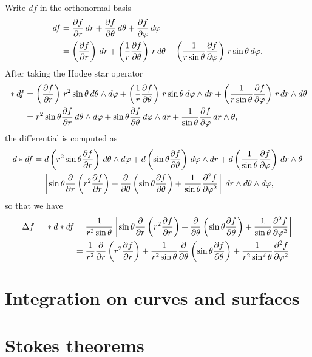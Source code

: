 \documentclass{../note}
\begin{document}
\begin{pf}
Write $df$ in the orthonormal basis
\begin{align*}
df&=\pd{f}{r}\,dr+\pd{f}{\theta}\,d\theta+\pd{f}{\f}\,d\f\\
&=\left(\pd{f}{r}\right)\,dr+\left(\frac1r\pd{f}{\theta}\right)\,r\,d\theta+\left(\frac1{r\sin\theta}\pd{f}{\f}\right)\,r\sin\theta\,d\f.
\end{align*}
After taking the Hodge star operator
\begin{align*}
{}*df&=\left(\pd{f}{r}\right)\,r^2\sin\theta\,d\theta\wedge d\f+\left(\frac1r\pd{f}{\theta}\right)\,r\sin\theta\,d\f\wedge dr+\left(\frac1{r\sin\theta}\pd{f}{\f}\right)\,r\,dr\wedge d\theta\\
&=r^2\sin\theta\pd{f}{r}\,d\theta\wedge d\f+\sin\theta\pd{f}{\theta}\,d\f\wedge dr+\frac1{\sin\theta}\pd{f}{\f}\,dr\wedge\theta,
\end{align*}
the differential is computed as
\begin{align*}
d*df&=d\left(r^2\sin\theta\pd{f}{r}\right)\,d\theta\wedge d\f+d\left(\sin\theta\pd{f}{\theta}\right)\,d\f\wedge dr+d\left(\frac1{\sin\theta}\pd{f}{\f}\right)\,dr\wedge\theta\\
&=\left[\sin\theta\pd{r}\left(r^2\pd{f}{r}\right)+\pd{\theta}\left(\sin\theta\pd{f}{\theta}\right)+\frac1{\sin\theta}\pd[2]{f}{\f}\right]\,dr\wedge d\theta\wedge d\f,
\end{align*}
so that we have
\begin{align*}
\Delta f={}*d*df&=\frac1{r^2\sin\theta}\left[\sin\theta\pd{r}\left(r^2\pd{f}{r}\right)+\pd{\theta}\left(\sin\theta\pd{f}{\theta}\right)+\frac1{\sin\theta}\pd[2]{f}{\f}\right]\\
&=\frac1{r^2}\pd{r}\left(r^2\pd{f}{r}\right)+\frac1{r^2\sin\theta}\pd{\theta}\left(\sin\theta\pd{f}{\theta}\right)+\frac1{r^2\sin^2\theta}\pd[2]{f}{\f}
\end{align*}

\end{pf}





\section{Integration on curves and surfaces}

\begin{prb}
\end{prb}

\begin{prb}
\end{prb}


\section{Stokes theorems}
\begin{prb}
\end{prb}

\begin{prb}
\end{prb}

\begin{prb}
\end{prb}
\end{document}
